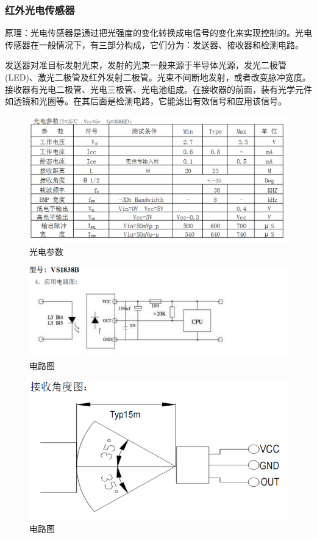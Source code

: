 \documentclass{ctexart}
\begin{document}
\subsubsection{红外光电传感器}
原理：光电传感器是通过把光强度的变化转换成电信号的变化来实现控制的。光电传感器在一般情况下，有三部分构成，它们分为：发送器、接收器和检测电路。\par
发送器对准目标发射光束，发射的光束一般来源于半导体光源，发光二极管(LED)、激光二极管及红外发射二极管。光束不间断地发射，或者改变脉冲宽度。接收器有光电二极管、光电三极管、光电池组成。在接收器的前面，装有光学元件如透镜和光圈等。在其后面是检测电路，它能滤出有效信号和应用该信号。\par
\begin{figure}[H]
\centering
    \includegraphics[width = \textwidth]{022}
    \caption{光电参数}\par
\end{figure}
\begin{figure}[H]
\centering
    \includegraphics[width = \textwidth]{023}
    \caption{电路图}\par
\end{figure}
\begin{figure}[H]
\centering
    \includegraphics[width = \textwidth]{024}
    \caption{电路图}\par
\end{figure}
\end{document}
